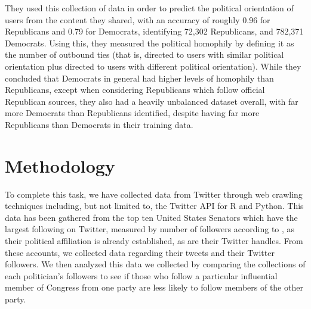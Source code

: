 \documentclass[journal]{IEEEtran}
\begin{document}
	They used this collection of data in order to predict the political orientation of users from the content they shared, with an accuracy of roughly 0.96 for Republicans and 0.79 for Democrats, identifying 72,302 Republicans, and 782,371 Democrats. Using this, they measured the political homophily by defining it as the number of outbound ties (that is, directed to users with similar political orientation plus directed to users with different political orientation). While they concluded that Democrats in general had higher levels of homophily than Republicans, except when considering Republicans which follow official Republican sources, they also had a heavily unbalanced dataset overall, with far more Democrats than Republicans identified, despite having far more Republicans than Democrats in their training data. 
	
	\section{Methodology}
	
	To complete this task, we have collected data from Twitter through web crawling techniques including, but not limited to, the Twitter API for R and Python. This data has been gathered from the top ten United States Senators which have the largest following on Twitter, measured by number of followers according to \cite{senatorFollowers}, as their political affiliation is already established, as are their Twitter handles. From these accounts, we collected data regarding their tweets and their Twitter followers. We then analyzed this data we collected by comparing the collections of each politician's followers to see if those who follow a particular influential member of Congress from one party are less likely to follow members of the other party. 
	
	
	
	
\end{document}
